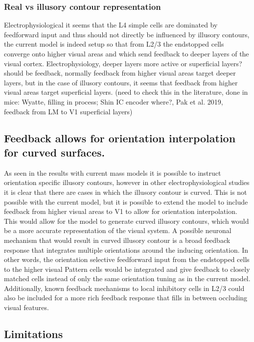 \documentclass[12pt]{article}
\begin{document}
  \subsubsection{Real vs illusory contour representation}
  Electrophysiological it seems that the L4 simple cells are dominated by feedforward input and thus should not directly be influenced by illusory contours, the current model is indeed setup so that from L2/3 the endstopped cells converge onto higher visual areas and which send feedback to deeper layers of the visual cortex. 
  Electrophysiology, deeper layers more active or superficial layers? should be feedback, normally feedback from higher visual areas target deeper layers, but in the case of illusory contours, it seems that feedback from higher visual areas target superficial layers. (need to check this in the literature, done in mice: Wyatte, filling in process; Shin IC encoder where?, Pak et al. 2019, feedback from LM to V1 superficial layers)

\subsection{Feedback allows for orientation interpolation for curved surfaces.}
As seen in the results with current mass models it is possible to instruct orientation specific illusory contours, however in other electrophysiological studies it is clear that there are cases in which the illusory contour is curved. This is not possible with the current model, but it is possible to extend the model to include feedback from higher visual areas to V1 to allow for orientation interpolation. This would allow for the model to generate curved illusory contours, which would be a more accurate representation of the visual system. A possible neuronal mechanism that would result in curved illusory contour is a broad feedback response that integrates multiple orientations around the inducing orientation. In other words, the orientation selective feedforward input from the endstopped cells to the higher visual Pattern cells would be integrated and give feedback to closely matched cells instead of only the same orientation tuning as in the current model. Additionally, known feedback mechanisms to local inhibitory cells in L2/3 could also be included for a more rich feedback response that fills in between occluding visual features.
\subsection{Limitations}
\end{document}
